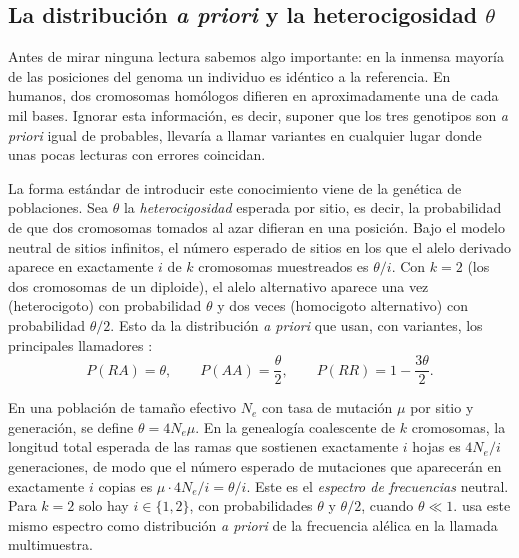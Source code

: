 \subsection{La distribución \emph{a priori} y la heterocigosidad $\theta$}

Antes de mirar ninguna lectura sabemos algo importante: en la inmensa mayoría de las posiciones del genoma un individuo es idéntico a la referencia. En humanos, dos cromosomas homólogos difieren en aproximadamente una de cada mil bases. Ignorar esta información, es decir, suponer que los tres genotipos son \emph{a priori} igual de probables, llevaría a llamar variantes en cualquier lugar donde unas pocas lecturas con errores coincidan.

La forma estándar de introducir este conocimiento viene de la genética de poblaciones. Sea $\theta$ la \emph{heterocigosidad} esperada por sitio, es decir, la probabilidad de que dos cromosomas tomados al azar difieran en una posición. Bajo el modelo neutral de sitios infinitos, el número esperado de sitios en los que el alelo derivado aparece en exactamente $i$ de $k$ cromosomas muestreados es $\theta/i$. Con $k=2$ (los dos cromosomas de un diploide), el alelo alternativo aparece una vez (heterocigoto) con probabilidad $\theta$ y dos veces (homocigoto alternativo) con probabilidad $\theta/2$. Esto da la distribución \emph{a priori} que usan, con variantes, los principales llamadores \parencite{c09-nielsen2011,c09-li2011stat}:
\begin{equation}\label{eq:09-prior}
P(RA) = \theta,\qquad P(AA) = \frac{\theta}{2},\qquad P(RR) = 1-\frac{3\theta}{2}.
\end{equation}

\begin{simbolos}
\end{simbolos}

\begin{profundizacion}
En una población de tamaño efectivo $N_e$ con tasa de mutación $\mu$ por sitio y generación, se define $\theta = 4N_e\mu$. En la genealogía coalescente de $k$ cromosomas, la longitud total esperada de las ramas que sostienen exactamente $i$ hojas es $4N_e/i$ generaciones, de modo que el número esperado de mutaciones que aparecerán en exactamente $i$ copias es $\mu\cdot 4N_e/i = \theta/i$. Este es el \emph{espectro de frecuencias} neutral. Para $k=2$ solo hay $i\in\{1,2\}$, con probabilidades $\theta$ y $\theta/2$, cuando $\theta\ll1$. \textcite{c09-li2011stat} usa este mismo espectro como distribución \emph{a priori} de la frecuencia alélica en la llamada multimuestra.
\end{profundizacion}

